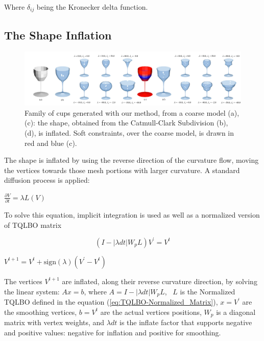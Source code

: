 \documentclass[10pt, conference]{IEEEtran}
\begin{document}
Where $\delta_{ij}$ being the Kronecker delta function.


\subsection{The Shape Inflation\label{sub:Curvature-Enhancing}}

\begin{figure}[t]
\includegraphics[width=1\textwidth]{figs/teaser_cup}

\caption{\label{fig:Subdivision-Cups} Family of cups generated with our method,
from a coarse model (a), (c): the shape, obtained from the Catmull-Clark
Subdivision (b), (d), is inflated. Soft constraints, over the coarse
model, is drawn in red and blue (c).}


\end{figure}


The shape is inflated by using the reverse direction of the curvature
flow, moving the vertices towards those mesh portions with larger
curvature. A standard diffusion process is applied:

\begin{center}
$\frac{\partial V}{\partial t}=\lambda L\left(V\right)$ 
\par\end{center}

To solve this equation, implicit integration is used as well as a
normalized version of TQLBO matrix

\begin{equation}
\left(I-\left|\lambda dt\right|W_{p}L\right)V^{\prime}=V^{t}\label{eq:Lineal_System_with_wp}
\end{equation}


\begin{center}
$V^{t+1}=V^{t}+\mbox{sign}\left(\lambda\right)\left(V^{\prime}-V^{t}\right)$
\par\end{center}

The vertices $V^{t+1}$ are inflated, along their reverse curvature
direction, by solving the linear system: $Ax=b$, where $A=I-\left|\lambda dt\right|W_{p}L$,~
$L$ is the Normalized TQLBO defined in the equation (\ref{eq:TQLBO-Normalized_Matrix}),
$x=V^{\prime}$ are the smoothing vertices, $b=V^{t}$ are the actual
vertices positions, $W_{p}$ is a diagonal matrix with vertex weights,
 and $\lambda dt$ is the inflate factor that supports negative
and positive values: negative for inflation and positive for smoothing. 
\end{document}
